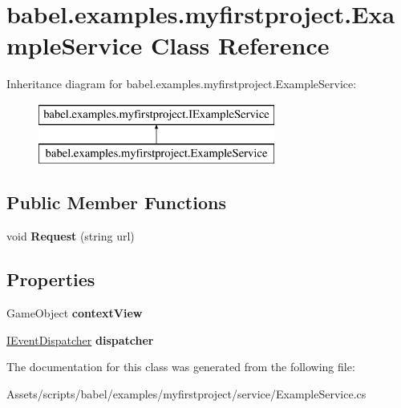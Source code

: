 \hypertarget{classbabel_1_1examples_1_1myfirstproject_1_1_example_service}{\section{babel.\-examples.\-myfirstproject.\-Example\-Service Class Reference}
\label{classbabel_1_1examples_1_1myfirstproject_1_1_example_service}
}
Inheritance diagram for babel.\-examples.\-myfirstproject.\-Example\-Service\-:\begin{figure}[H]
\begin{center}
\leavevmode
\includegraphics[height=2.000000cm]{classbabel_1_1examples_1_1myfirstproject_1_1_example_service}
\end{center}
\end{figure}
\subsection*{Public Member Functions}
\begin{DoxyCompactItemize}
\item 
\hypertarget{classbabel_1_1examples_1_1myfirstproject_1_1_example_service_a77f0b5a764b7323e8b63313ed7f5f1a1}{void {\bfseries Request} (string url)}\label{classbabel_1_1examples_1_1myfirstproject_1_1_example_service_a77f0b5a764b7323e8b63313ed7f5f1a1}

\end{DoxyCompactItemize}
\subsection*{Properties}
\begin{DoxyCompactItemize}
\item 
\hypertarget{classbabel_1_1examples_1_1myfirstproject_1_1_example_service_ad0b4836f8bc8c5adf6ce982b5711535c}{Game\-Object {\bfseries context\-View}}\label{classbabel_1_1examples_1_1myfirstproject_1_1_example_service_ad0b4836f8bc8c5adf6ce982b5711535c}

\item 
\hypertarget{classbabel_1_1examples_1_1myfirstproject_1_1_example_service_a26136b8e477ec0c7470ac09fe54ddfae}{\hyperlink{interfacebabel_1_1extensions_1_1dispatcher_1_1eventdispatcher_1_1api_1_1_i_event_dispatcher}{I\-Event\-Dispatcher} {\bfseries dispatcher}}\label{classbabel_1_1examples_1_1myfirstproject_1_1_example_service_a26136b8e477ec0c7470ac09fe54ddfae}

\end{DoxyCompactItemize}


The documentation for this class was generated from the following file\-:\begin{DoxyCompactItemize}
\item 
Assets/scripts/babel/examples/myfirstproject/service/Example\-Service.\-cs\end{DoxyCompactItemize}
